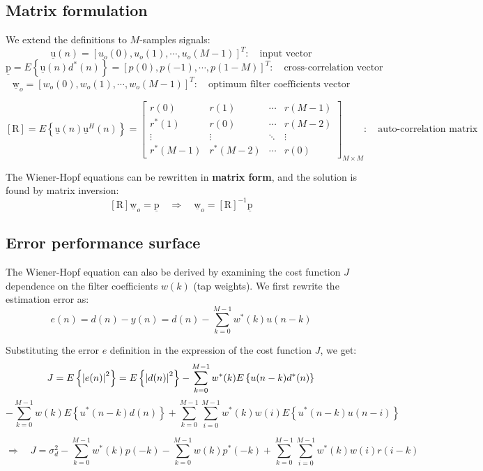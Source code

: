 \subsection{Matrix formulation}

We extend the definitions to \(M\)-samples signals:
\[
\underline{\mathrm{u}}(n) = [u_o(0), u_o(1), \cdots, u_o(M-1)]^T: \quad \text{input vector}
\]
\[
\underline{\mathrm{p}} = E\left\{\underline{\mathrm{u}}(n) d^*(n)\right\} = [p(0), p(-1), \cdots, p(1-M)]^T: \quad \text{cross-correlation vector}
\]
\[
\underline{\mathrm{w}}_o = [w_o(0), w_o(1), \cdots, w_o(M-1)]^T: \quad \text{optimum filter coefficients vector}
\]


\[
[\mathrm{R}] = E\left\{\underline{\mathrm{u}}(n)\underline{\mathrm{u}}^H(n)\right\} =
\begin{bmatrix}
r(0) & r(1) & \cdots & r(M-1) \\[3pt]
r^*(1) & r(0) & \cdots & r(M-2) \\[3pt]
\vdots & \vdots & \ddots & \vdots \\[3pt]
r^*(M-1) & r^*(M-2) & \cdots & r(0)
\end{bmatrix}_{M \times M}: \quad \text{auto-correlation matrix}
\]

The Wiener-Hopf equations can be rewritten in \textbf{matrix form}, and the solution is found by matrix inversion:
\[
[\mathrm{R}] \underline{\mathrm{w}}_o = \underline{\mathrm{p}} \quad \Rightarrow \quad \underline{\mathrm{w}}_o = [\mathrm{R}]^{-1} \underline{\mathrm{p}}
\]

\subsection{Error performance surface}

The Wiener-Hopf equation can also be derived by examining the cost function \( J \) dependence on the filter coefficients \(w(k)\) (tap weights).
We first rewrite the estimation error as:
\[
e(n) = d(n) - y(n) = d(n) - \sum_{k=0}^{M-1} w^*(k) u(n-k)
\]

Substituting the error $e$ definition in the expression of the cost function $J$, we get:
\[
J = E\left\{\abs{e(n)}^2\right\} = E\left\{\abs{d(n)}^2\right\} - \sum_{k=0}^{M-1} w^*(k) E\left\{u(n-k) d^*(n)\right\}
\]
\[
- \sum_{k=0}^{M-1} w(k) E\left\{u^*(n-k)d(n)\right\} + \sum_{k=0}^{M-1} \sum_{i=0}^{M-1} w^*(k) w(i) E\left\{ u^*(n-k) u(n-i) \right\}
\]

\[
\Rightarrow \quad J = \sigma_d^2 - \sum_{k=0}^{M-1} w^*(k)p(-k) - \sum_{k=0}^{M-1} w(k)p^*(-k) + \sum_{k=0}^{M-1} \sum_{i=0}^{M-1} w^*(k)w(i)r(i-k)
\]

